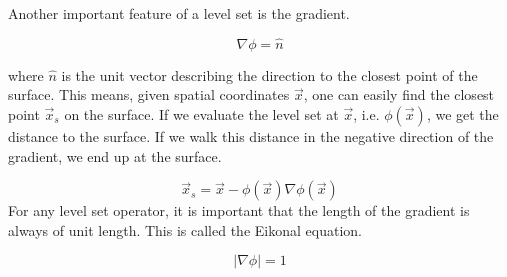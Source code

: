 Another important feature of a level set is the gradient.

\begin{equation}
\nabla \phi = \hat{n}
\end{equation}

where $\hat{n}$ is the unit vector describing the direction to the closest point of the surface. This means, given spatial coordinates $\vec{x}$, one can easily find the closest point $\vec{x}_s$ on the surface. If we evaluate the level set at $\vec{x}$, i.e. $\phi(\vec{x})$, we get the distance to the surface. If we walk this distance in the negative direction of the gradient, we end up at the surface.

\begin{equation}
\vec{x}_s = \vec{x} - \phi(\vec{x})\nabla \phi(\vec{x})
\end{equation}
\noindent
For any level set operator, it is important that the length of the gradient is always of unit length. This is called the Eikonal equation.

\begin{equation}
|\nabla \phi| = 1
\label{eikonaleqfirst}
\end{equation}
